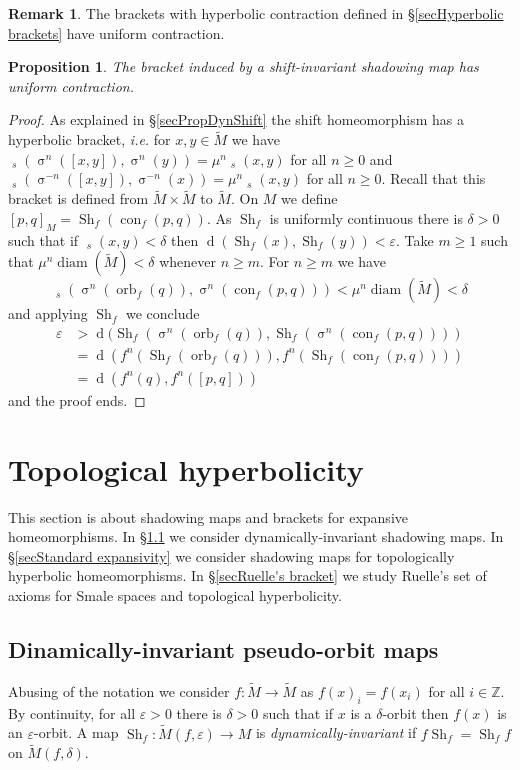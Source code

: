 \documentclass[12pt]{amsart}
\DeclareMathOperator{\shift}{\sigma}
\theoremstyle{plain}
\newtheorem{prop}[thm]{Proposition}
\theoremstyle{definition}
\newtheorem{rmk}[thm]{Remark}
\theoremstyle{remark}
\DeclareMathOperator{\diam}{diam}
\DeclareMathOperator{\dist}{d}
\DeclareMathOperator{\tdist}{\tilde{d}}
\DeclareMathOperator{\orb}{orb}
\DeclareMathOperator{\con}{con}
\DeclareMathOperator{\shm}{Sh}
\newcommand{\Z}{\mathbb Z}
\renewcommand{\epsilon}{\varepsilon}
\newcommand{\tM}{\tilde{M}}
\begin{document}
\begin{rmk}
	The brackets with hyperbolic contraction defined in \S\ref{secHyperbolic brackets} have uniform contraction.
\end{rmk}

\begin{prop}
	\label{propSh-invShmBrUnifCont}
	The bracket induced by a shift-invariant shadowing map has uniform contraction.
\end{prop}

\begin{proof}
As explained in \S \ref{secPropDynShift}
the shift homeomorphism has a hyperbolic bracket, \textit{i.e.}
for $x,y\in \tM$ we have
$\tdist_s(\shift^n([x,y]),\shift^n(y))=\mu^n \tdist_s(x,y)$ for all $n\geq 0$
and
$\tdist_s(\shift^{-n}([x,y]),\shift^{-n}(x))=\mu^n \tdist_s(x,y)$ for all $n\geq 0$.
Recall that this bracket is defined from $\tM\times\tM$ to $\tM$.
On $M$ we define $[p,q]_M=\shm_f(\con_f(p,q))$.
As $\shm_f$ is uniformly continuous there is $\delta>0$ such that if $\tdist_s(x,y)<\delta$ then $\dist(\shm_f(x),\shm_f(y))<\epsilon$.
Take $m\geq 1$ such that
$\mu^n\diam(\tM)<\delta$ whenever $n\geq m$.
For $n\geq m$ we have
\[
	\tdist_s(\shift^n(\orb_f(q)),\shift^n(\con_f(p,q)))<\mu^n\diam(\tM)<\delta
\]
and applying $\shm_f$ we conclude
\begin{align*}
	\epsilon&>\dist(\shm_f(\shift^n(\orb_f(q)),\shm_f(\shift^n(\con_f(p,q))))\\
	&=\dist(f^n(\shm_f(\orb_f(q))),f^n(\shm_f(\con_f(p,q))))\\
	&=\dist(f^n(q),f^n([p,q]))
\end{align*}
and the proof ends.
\end{proof}

\section{Topological hyperbolicity}
\label{Topological hyperbolicity}
This section is about shadowing maps and brackets for expansive homeomorphisms.
In \S\ref{secDinamically-invariant pseudo-orbit maps} we consider dynamically-invariant shadowing maps.
In \S\ref{secStandard expansivity} we consider shadowing maps for
topologically hyperbolic homeomorphisms.
In \S\ref{secRuelle's bracket} we study Ruelle's set of axioms for Smale spaces and topological hyperbolicity.

\subsection{Dinamically-invariant pseudo-orbit maps}
\label{secDinamically-invariant pseudo-orbit maps}
Abusing of the notation we consider $f\colon \tM\to \tM$ as $f(x)_i=f(x_i)$ for all $i\in\Z$.
By continuity, for all $\epsilon>0$ there is $\delta>0$ such that
if $x$ is a $\delta$-orbit then $f(x)$ is an $\epsilon$-orbit.
A map $\shm_f\colon \tM(f,\epsilon)\to M$ is \textit{dynamically-invariant} if $f \shm_f=\shm_f f$ on $\tM(f,\delta)$.
\end{document}
